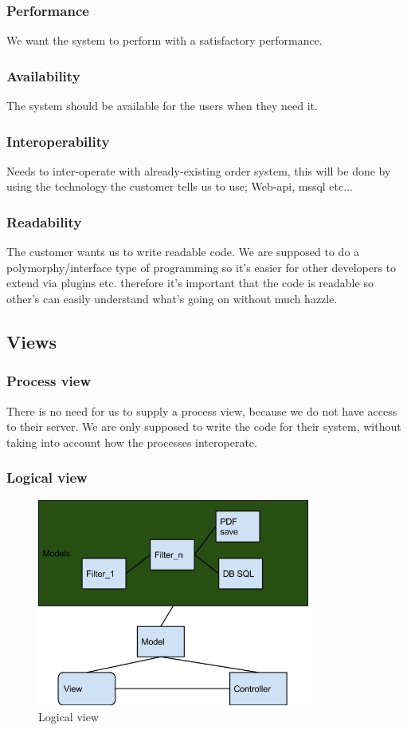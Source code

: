 \subsubsection{Performance}
We want the system to perform with a satisfactory performance.
\subsubsection{Availability}
The system should be available for the users when they need it.
\subsubsection{Interoperability}
Needs to inter-operate with already-existing order system, this will be done by using the technology the customer tells us to use; Web-api, mssql etc...
\subsubsection{Readability}
The customer wants us to write readable code. We are supposed to do a polymorphy/interface type of programming so it's easier for other developers to extend via plugins etc. therefore it's important that the code is readable so other's can easily understand what's going on without much hazzle.

\subsection{Views}


\subsubsection{Process view}
There is no need for us to supply a process view, because we do not have access to their server. We are only supposed to write the code for their system, without taking into account how the processes interoperate.
\subsubsection{Logical view}
\begin{figure}[h]
\centering
\includegraphics[width=0.8\textwidth]{images/architecture00.png}
\caption{Logical view}
\label{fig:logical_view}
\end{figure}
\newpage

